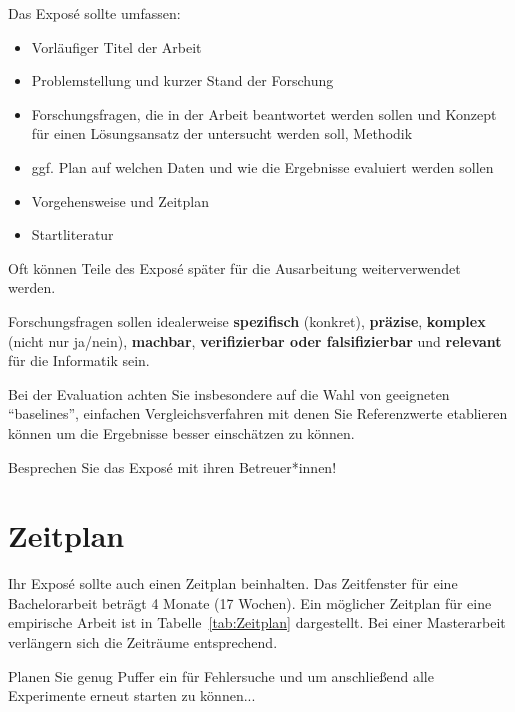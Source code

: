 \pagebreak[2]
Das Exposé sollte umfassen:
\begin{itemize}
\item
Vorläufiger Titel der Arbeit
\item
Problemstellung und kurzer Stand der Forschung
\item
Forschungsfragen, die in der Arbeit beantwortet werden sollen und Konzept für einen Lösungsansatz der untersucht werden soll, Methodik
\item
ggf.{} Plan auf welchen Daten und wie die Ergebnisse evaluiert werden sollen
\item
Vorgehensweise und Zeitplan
\item
Startliteratur
\end{itemize}

Oft können Teile des Exposé später für die Ausarbeitung weiterverwendet werden.

Forschungsfragen sollen idealerweise \textbf{spezifisch} (konkret), \textbf{präzise}, \textbf{komplex} (nicht nur ja/nein),
\textbf{machbar}, \textbf{verifizierbar oder falsifizierbar} und \textbf{relevant} für die Informatik sein.

Bei der Evaluation achten Sie insbesondere auf die Wahl von geeigneten
\enquote{baselines}, einfachen Vergleichsverfahren mit denen Sie Referenzwerte
etablieren können um die Ergebnisse besser einschätzen zu können.

Besprechen Sie das Exposé mit ihren Betreuer*innen!

\section{Zeitplan}

Ihr Exposé sollte auch einen Zeitplan beinhalten.
Das Zeitfenster für eine Bachelorarbeit beträgt 4 Monate (17 Wochen).
Ein möglicher Zeitplan für eine empirische Arbeit ist in Tabelle~\ref{tab:Zeitplan} dargestellt.
Bei einer Masterarbeit verlängern sich die Zeiträume entsprechend.

Planen Sie genug Puffer ein für Fehlersuche und um anschließend alle Experimente erneut starten zu können...

